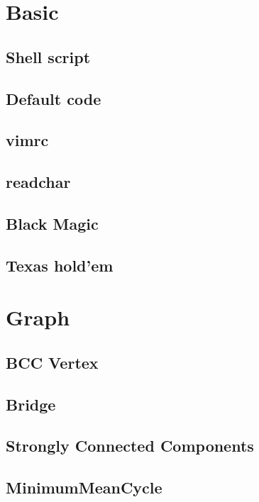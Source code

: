 \section{Basic}
\subsection{Shell script}

\subsection{Default code}

\subsection{vimrc}

\subsection{readchar}

\subsection{Black Magic}

\subsection{Texas hold'em}



\section{Graph}
\subsection{BCC Vertex}

\subsection{Bridge}

\subsection{Strongly Connected Components}

\subsection{MinimumMeanCycle}

